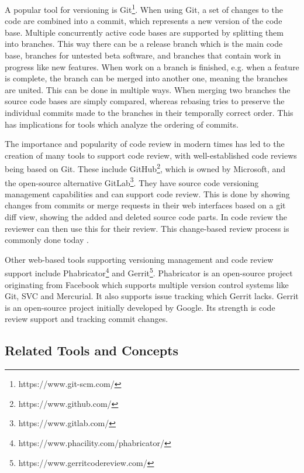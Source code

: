 \documentclass[a4paper,11pt,twoside]{article}
\theoremstyle{definition} %
\renewcommand{\cite}[1]{\citep{#1}}
\begin{document}
A popular tool for versioning is Git\footnote{https://www.git-scm.com/}. When using Git, a set of changes to the code are combined into a commit, which represents a new version of the code base. Multiple concurrently active code bases are supported by splitting them into branches. This way there can be a release branch which is the main code base, branches for untested beta software, and branches that contain work in progress like new features. When work on a branch is finished, e.g. when a feature is complete, the branch can be merged into another one, meaning the branches are united. This can be done in multiple ways. When merging two branches the source code bases are simply compared, whereas rebasing tries to preserve the individual commits made to the branches in their temporally correct order. This has implications for tools which analyze the ordering of commits. 

The importance and popularity of code review in modern times has led to the creation of many tools to support code review, with well-established code reviews being based on Git. These include GitHub\footnote{https://www.github.com/}, which is owned by Microsoft, and the open-source alternative GitLab\footnote{https://www.gitlab.com/}. They have source code versioning management capabilities and can support code review. This is done by showing changes from commits or merge requests in their web interfaces based on a git diff view, showing the added and deleted source code parts. In code review the reviewer can then use this for their review. This change-based review process is commonly done today \cite{6606617}. 

Other web-based tools supporting versioning management and code review support include Phabricator\footnote{https://www.phacility.com/phabricator/} and Gerrit\footnote{https://www.gerritcodereview.com/}. Phabricator is an open-source project originating from Facebook which supports multiple version control systems like Git, SVC and Mercurial. It also supports issue tracking which Gerrit lacks. Gerrit is an open-source project initially developed by Google. Its strength is code review support and tracking commit changes.

\subsection{Related Tools and Concepts} \label{SubSec:RelTools+Conc}
\end{document}
